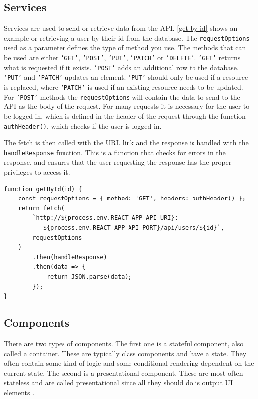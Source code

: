 \subsection{Services}
Services are used to send or retrieve data from the API. 
\autoref{get-by-id} shows an example or retrieving a user by their id from the database.
The \texttt{requestOptions} used as a parameter defines the type of method you use.
The methods that can be used are either \texttt{'GET'}, \texttt{'POST'}, \texttt{'PUT'}, \texttt{'PATCH'} or \texttt{'DELETE'}.
\texttt{'GET'} returns what is requested if it exists.
\texttt{'POST'} adds an additional row to the database.
\texttt{'PUT'} and \texttt{'PATCH'} updates an element. 
\texttt{'PUT'} should only be used if a resource is replaced, where \texttt{'PATCH'} is used if an existing resource needs to be updated.
For \texttt{'POST'} methods the \texttt{requestOptions} will contain the data to send to the API as the body of the request.
For many requests it is necessary for the user to be logged in, which is defined in the header of the request through the function \texttt{authHeader()}, which checks if the user is logged in.

The fetch is then called with the URL link and the response is handled with the \texttt{handleResponse} function. 
This is a function that checks for errors in the response, and ensures that the user requesting the response has the proper privileges to access it.

\begin{lstlisting}[caption={Function to get a user by ID.}, captionpos=b, label={get-by-id}]
function getById(id) {
	const requestOptions = { method: 'GET', headers: authHeader() };
	return fetch(
        `http://${process.env.REACT_APP_API_URI}:
           ${process.env.REACT_APP_API_PORT}/api/users/${id}`,
		requestOptions
	)
		.then(handleResponse)
		.then(data => {
			return JSON.parse(data);
		});
}
\end{lstlisting}

\subsection{Components}
There are two types of components. 
The first one is a stateful component, also called a container.
These are typically class components and have a state.
They often contain some kind of logic and some conditional rendering dependent on the current state.
The second is a presentational component.
These are most often stateless and are called presentational since all they should do is output UI elements \cite{Vumbula-react}.

